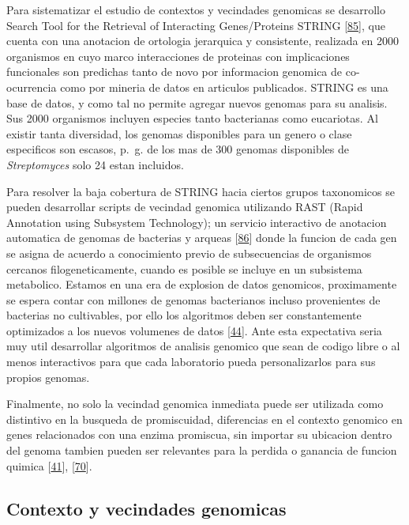 \documentclass[12pt,twoside]{reedthesis}
\begin{document}
  Para sistematizar el estudio de contextos y vecindades genomicas se
  desarrollo Search Tool for the Retrieval of Interacting Genes/Proteins
  STRING {[}\protect\hyperlink{ref-snel_string_2000}{85}{]}, que cuenta
  con una anotacion de ortologia jerarquica y consistente, realizada en
  2000 organismos en cuyo marco interacciones de proteinas con
  implicaciones funcionales son predichas tanto de novo por informacion
  genomica de co-ocurrencia como por mineria de datos en articulos
  publicados. STRING es una base de datos, y como tal no permite agregar
  nuevos genomas para su analisis. Sus 2000 organismos incluyen especies
  tanto bacterianas como eucariotas. Al existir tanta diversidad, los
  genomas disponibles para un genero o clase especificos son escasos,
  p.~g. de los mas de 300 genomas disponibles de \emph{Streptomyces} solo
  24 estan incluidos.
  
  Para resolver la baja cobertura de STRING hacia ciertos grupos
  taxonomicos se pueden desarrollar scripts de vecindad genomica
  utilizando RAST (Rapid Annotation using Subsystem Technology); un
  servicio interactivo de anotacion automatica de genomas de bacterias y
  arqueas {[}\protect\hyperlink{ref-aziz_rast_2008}{86}{]} donde la
  funcion de cada gen se asigna de acuerdo a conocimiento previo de
  subsecuencias de organismos cercanos filogeneticamente, cuando es
  posible se incluye en un subsistema metabolico. Estamos en una era de
  explosion de datos genomicos, proximamente se espera contar con millones
  de genomas bacterianos incluso provenientes de bacterias no cultivables,
  por ello los algoritmos deben ser constantemente optimizados a los
  nuevos volumenes de datos
  {[}\protect\hyperlink{ref-medema_computational_2015}{44}{]}. Ante esta
  expectativa seria muy util desarrollar algoritmos de analisis genomico
  que sean de codigo libre o al menos interactivos para que cada
  laboratorio pueda personalizarlos para sus propios genomas.
  
  Finalmente, no solo la vecindad genomica inmediata puede ser utilizada
  como distintivo en la busqueda de promiscuidad, diferencias en el
  contexto genomico en genes relacionados con una enzima promiscua, sin
  importar su ubicacion dentro del genoma tambien pueden ser relevantes
  para la perdida o ganancia de funcion quimica
  {[}\protect\hyperlink{ref-noda-garcia_evolution_2013}{41}{]},
  {[}\protect\hyperlink{ref-juarez-vazquez_evolution_2017}{70}{]}.
  
  \subsection{Contexto y vecindades
  genomicas}\label{contexto-y-vecindades-genomicas}
  
\end{document}
